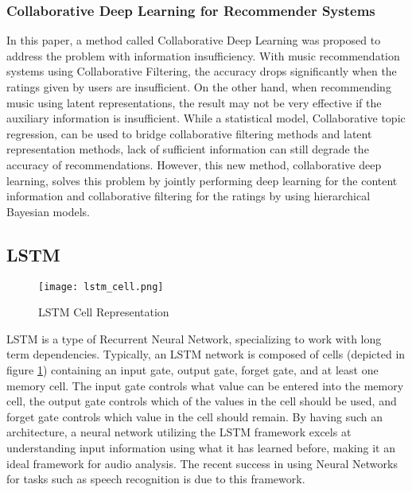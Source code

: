         \subsubsection{Collaborative Deep Learning for Recommender Systems \cite{Wang2014}}
        In this paper, a method called Collaborative Deep Learning was proposed to address the problem with information insufficiency. With music recommendation systems using Collaborative Filtering, the accuracy drops significantly when the ratings given by users are insufficient. On the other hand, when recommending music using latent representations, the result may not be very effective if the auxiliary information is insufficient. While a statistical model, Collaborative topic regression, can be used to bridge collaborative filtering methods and latent representation methods, lack of sufficient information can still degrade the accuracy of recommendations. However, this new method, collaborative deep learning, solves this problem by jointly performing deep learning for the content information and collaborative filtering for the ratings by using hierarchical Bayesian models.

    \subsection{LSTM \cite{Hochreiter1997}}
        \begin{figure}[H]
            \texttt{[image: lstm\_cell.png]}
            \caption{LSTM Cell Representation}
            \label{fig:lstm-cell}
        \end{figure}
        LSTM is a type of Recurrent Neural Network, specializing to work with long term dependencies. Typically, an LSTM network is composed of cells (depicted in figure \ref{fig:lstm-cell}) containing an input gate, output gate, forget gate, and at least one memory cell. The input gate controls what value can be entered into the memory cell, the output gate controls which of the values in the cell should be used, and forget gate controls which value in the cell should remain. By having such an architecture, a neural network utilizing the LSTM framework excels at understanding input information using what it has learned before, making it an ideal framework for audio analysis. The recent success in using Neural Networks for tasks such as speech recognition is due to this framework.